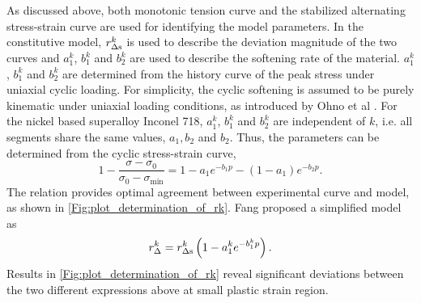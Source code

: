 
As discussed above, both monotonic tension curve and the stabilized alternating stress-strain curve are used for identifying the model parameters.
In the constitutive model, $r_{\Delta \rm{s}}^k$ is used to describe the deviation magnitude of the two curves and $a_{1}^k$, $b_{1}^k$ and $b_{2}^k$ are used to describe the softening rate of the material.
$a_{1}^k$, $b_{1}^k$ and $b_{2}^k$ are determined from the history curve of the peak stress under uniaxial cyclic loading. For simplicity, the cyclic softening is assumed to be purely kinematic under uniaxial loading conditions, as introduced by Ohno et al \cite{Ohno1993375}.
For the nickel based superalloy Inconel 718, $a_{1}^k$, $b_{1}^k$ and $b_{2}^k$ are independent of $k$, i.e. all segments share the same values, $a_1, b_2$ and $b_2$.
Thus, the parameters can be determined from the cyclic stress-strain curve,
\begin{equation}
1 - \frac{{\sigma  - {\sigma _0}}}{{{\sigma _0} - {\sigma _{\min }}}} = 1 - a_1{e^{ - b_1 p}} - \left( {1 - a_1} \right){e^{ - b_2 p}}.
\end{equation}
The relation provides optimal agreement between experimental curve and model, as shown in \ref{Fig:plot_determination_of_rk}. Fang \cite{fang2015cyclic} proposed a simplified model as
\begin{equation}
r_\Delta ^k = r_{\Delta \rm{s}}^k\left( 1 - a_1^k{e^{ - b_1^kp}}\right).
\label{Equ:fangrdeltak}
\end{equation}
Results in \ref{Fig:plot_determination_of_rk} reveal significant deviations between the two different expressions above at small plastic strain region.

